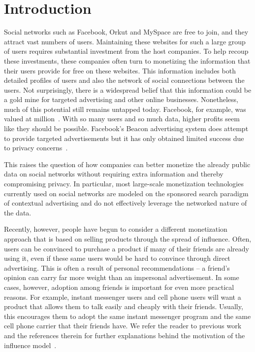 \documentclass[letterpaper,twoside]{article}
\begin{document}
\section{Introduction}
Social networks such as Facebook, Orkut and MySpace are free to join, and
they attract vast numbers of users. Maintaining these websites
for such a large group of users requires substantial investment from the host
companies.  To help recoup these investments, these companies often turn to
monetizing the information that their users provide for free on these
websites. This information includes both detailed profiles of users and also
the network of social connections between the users.  Not surprisingly, there
is a widespread belief that this information could be a gold mine for
targeted advertising and other online businesses.  Nonetheless, much of this
potential still remains untapped today. Facebook, for example, was valued at
 million~\cite{Wikipedia:Facebook}. With so many users and so
much data, higher profits seem like they should be possible.  Facebook's
Beacon advertising system does attempt to provide targeted advertisements but
it has only obtained limited success due to privacy
concerns~\cite{Wikipedia:Beacon}.

This raises the question of how companies can better monetize the already public
data on social networks without requiring extra information and thereby compromising
privacy. In particular, most large-scale monetization technologies
currently used on social networks are modeled on the sponsored search paradigm of
contextual advertising and do not effectively leverage the networked nature of the data.

Recently, however, people have begun to consider a different monetization
approach that is based on selling products through the spread of
influence. Often, users can be convinced to purchase a product if many of
their friends are already using it, even if these same users would be hard to
convince through direct advertising. This is often a result of personal
recommendations -- a friend's opinion can carry far more weight than an
impersonal advertisement. In some cases, however, adoption among friends is
important for even more practical reasons. For example, instant messenger
users and cell phone users will want a product that allows them to talk
easily and cheaply with their friends.  Usually, this encourages them to
adopt the same instant messenger program and the same cell phone carrier that
their friends have.  We refer the reader to previous work and the references
therein for further explanations behind the motivation of the influence
model~\cite{Kleinberg_AGT07,HMS08}.
\end{document}
